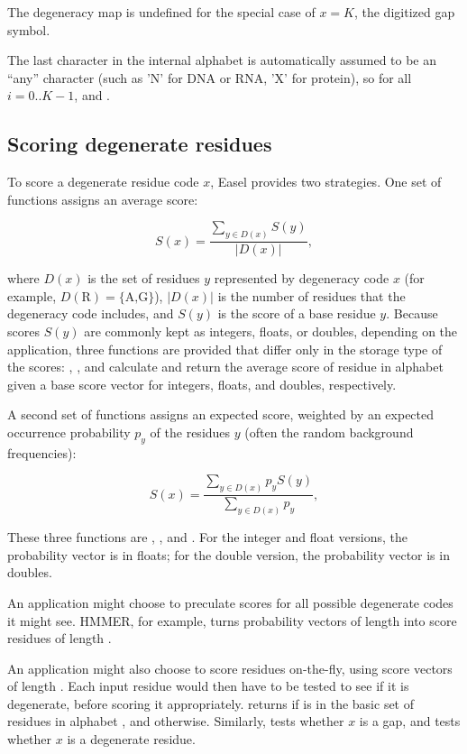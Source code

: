 The degeneracy map is undefined for the special case of $x=K$, the
digitized gap symbol.

The last character in the internal alphabet is automatically assumed
to be an ``any'' character (such as 'N' for DNA or RNA, 'X' for
protein), so  for all $i=0..K-1$, and
.

\subsection{Scoring degenerate residues}

To score a degenerate residue code $x$, Easel provides two strategies.
One set of functions assigns an average score:

\[
  S(x) =  \frac{\sum_{y \in D(x)}  S(y) } { |D(x)| },
\]

where $D(x)$ is the set of residues $y$ represented by degeneracy code
$x$ (for example, $D(\mbox{R}) = \{ \mbox{A,G} \}$), $| D(x) |$ is the
number of residues that the degeneracy code includes, and $S(y)$ is
the score of a base residue $y$. Because scores $S(y)$ are commonly
kept as integers, floats, or doubles, depending on the application,
three functions are provided that differ only in the storage type of
the scores: ,
, and
 calculate and return the average
score of residue  in alphabet  given a base score
vector  for integers, floats, and doubles,
respectively.

A second set of functions assigns an expected score, weighted by an
expected occurrence probability $p_y$ of the residues $y$ (often the
random background frequencies):

\[
  S(x) =  \frac{\sum_{y \in D(x)}  p_y S(y) } { \sum_{y \in D(x)} p_y },
\]

These three functions are ,
, and
.  For the integer and float
versions, the probability vector is in floats; for the double version,
the probability vector is in doubles.

An application might choose to preculate scores for all possible
degenerate codes it might see. HMMER, for example, turns probability
vectors of length  into score residues of length .

An application might also choose to score residues on-the-fly, using
score vectors of length . Each input residue  would
then have to be tested to see if it is degenerate, before scoring it
appropriately.   returns 
if  is in the basic set of  residues in alphabet
, and  otherwise. Similarly,
 tests whether $x$ is a gap, and
 tests whether $x$ is a degenerate
residue.

